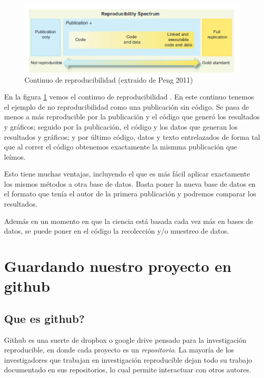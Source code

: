 \documentclass[]{book}
\begin{document}
\begin{figure}

{\centering \includegraphics[width=0.8\linewidth]{Reproducible} 

}

\caption{Continuo de reproducibilidad (extraido de Peng 2011)}\label{fig:reproducible}
\end{figure}

En la figura \ref{fig:reproducible} vemos el continuo de
reproducibilidad \citep{peng2011reproducible}. En este continuo tenemos
el ejemplo de no reproducibilidad como una publicación sin código. Se
pasa de menos a más reproducible por la publicación y el código que
generó los resultados y gráficos; seguido por la publicación, el código
y los datos que generan los resultados y gráficos; y por último código,
datos y texto entrelazados de forma tal que al correr el código
obtenemos exactamente la mismma publicación que leímos.

Esto tiene muchas ventajas, incluyendo el que es más fácil aplicar
exactamente los mismos métodos a otra base de datos. Basta poner la
nueva base de datos en el formato que tenía el autor de la primera
publicación y podremos comparar los resultados.

Además en un momento en que la ciencia está basada cada vez más en bases
de datos, se puede poner en el código la recolección y/o muestreo de
datos.

\hypertarget{guardando-nuestro-proyecto-en-github}{%
\section{Guardando nuestro proyecto en
github}\label{guardando-nuestro-proyecto-en-github}}

\hypertarget{que-es-github}{%
\subsection{Que es github?}\label{que-es-github}}

Github es una suerte de dropbox o google drive pensado para la
investigación reproducible, en donde cada proyecto es un
\emph{repositorio}. La mayoría de los investigadores que trabajan en
investigación reproducible dejan todo su trabajo documentado en sus
repositorios, lo cual permite interactuar con otros autores.
\end{document}

